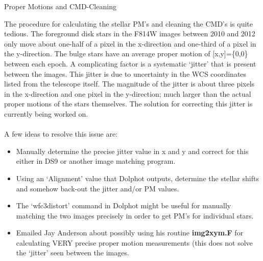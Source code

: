 \documentclass[12pt]{article}
\begin{document}
\begin{section}{Proper Motions and CMD-Cleaning}

The procedure for calculating the stellar PM's and cleaning the CMD's is quite tedious. The foreground disk stars in the F814W images between 2010 and 2012 only move about one-half of a pixel in the x-direction and one-third of a pixel in the y-direction. The bulge stars have an average proper motion of [x,y]=\{0,0\} between each epoch. A complicating factor is a systematic `jitter' that is present between the images. This jitter is due to uncertainty in the WCS coordinates listed from the telescope itself. The magnitude of the jitter is about three pixels in the x-direction and one pixel in the y-direction; much larger than the actual proper motions of the stars themselves. The solution for correcting this jitter is currently being worked on. \\
\\ 
A few ideas to resolve this issue are:
\begin{itemize}
\item Manually determine the precise jitter value in x and y and correct for this either in DS9 or another image matching program.
\item Using an `Alignment' value that Dolphot outputs, determine the stellar shifts and somehow back-out the jitter and/or PM values.
\item The `wfc3distort' command in Dolphot might be useful for manually matching the two images precisely in order to get PM's for individual stars.
\item Emailed Jay Anderson about possibly using his routine \textbf{img2xym.F} for calculating VERY precise proper motion measurements (this does not solve the `jitter' seen between the images.
\end{itemize}



\end{section}






 
\end{document}
